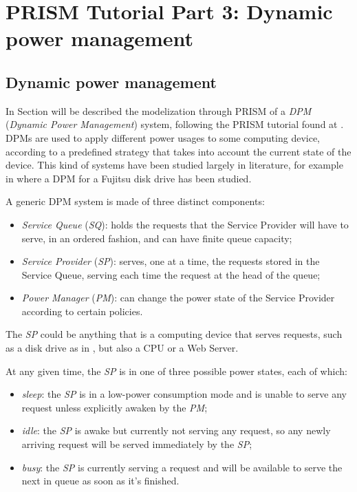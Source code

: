 
\section*{PRISM Tutorial Part 3: Dynamic power management}

  \subsection*{Dynamic power management}

    In Section will be described the modelization through PRISM of a \textit{DPM} (\textit{Dynamic Power Management}) system, following the PRISM tutorial found at \cite{prism-tutorial3}. DPMs are used to apply different power usages to some computing device, according to a predefined strategy that takes into account the current state of the device. This kind of systems have been studied largely in literature, for example in \cite{qiu2001stochastic} where a DPM for a Fujitsu disk drive has been studied.
    
    A generic DPM system is made of three distinct components:
    
    \begin{itemize}
      \item \textit{Service Queue} (\textit{SQ}): holds the requests that the Service Provider will have to serve, in an ordered fashion, and can have finite queue capacity;
      \item \textit{Service Provider} (\textit{SP}): serves, one at a time, the requests stored in the Service Queue, serving each time the request at the head of the queue;
      \item \textit{Power Manager} (\textit{PM}): can change the power state of the Service Provider according to certain policies.
    \end{itemize}
    
    The \textit{SP} could be anything that is a computing device that serves requests, such as a disk drive as in \cite{qiu2001stochastic}, but also a CPU or a Web Server.
    
    At any given time, the \textit{SP} is in one of three possible power states, each of which:
    
    \begin{itemize}
      \item \textit{sleep}: the \textit{SP} is in a low-power consumption mode and is unable to serve any request unless explicitly awaken by the \textit{PM};
      \item \textit{idle}: the \textit{SP} is awake but currently not serving any request, so any newly arriving request will be served immediately by the \textit{SP};
      \item \textit{busy}: the \textit{SP} is currently serving a request and will be available to serve the next in queue as soon as it's finished.
    \end{itemize}
    
